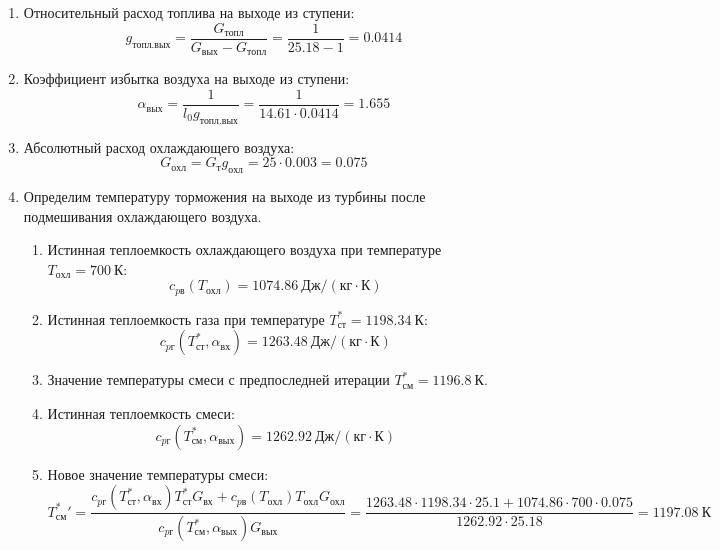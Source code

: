 \documentclass[a4paper,10pt]{article}
\begin{document}
\begin{enumerate}
        \item Относительный расход топлива на выходе из ступени:
        \[
            g_{топл.вых} = \frac{ G_{топл} }{ G_{вых} - G_{топл} } =
                 \frac{ 1 }{ 25.18 - 1 } =
            0.0414
        \]

        \item Коэффициент избытка воздуха на выходе из ступени:
        \[
            \alpha_{вых} = \frac{ 1 }{ l_0 g_{топл.вых} } =
                \frac{ 1 }{ 14.61 \cdot 0.0414 } =
            1.655
        \]

        \item Абсолютный расход охлаждающего воздуха:
        \[
            G_{охл} = G_т g_{охл} = 25 \cdot 0.003 =
            0.075
        \]

        \item Определим температуру торможения на выходе из турбины после подмешивания охлаждающего воздуха.
        \begin{enumerate}

            \item Истинная теплоемкость охлаждающего воздуха при температуре $T_{охл} = 700\ К $:
            \[
                c_{pв} (T_{охл}) = 1074.86\ Дж/ (кг \cdot К)
            \]

            \item Истинная теплоемкость газа при температуре $T_{ст}^* = 1198.34 \ К $:
            \[
                c_{pг} (T_{ст}^*, \alpha_{вх}) =
                1263.48\ Дж/ (кг \cdot К)
            \]

            \item Значение температуры смеси с предпоследней итерации $T_{см}^{*} = 1196.8\ К$.

            \item Истинная теплоемкость смеси:
            \[
                c_{pг} (T_{см}^{*}, \alpha_{вых}) =
                1262.92\ Дж/ (кг \cdot К)
            \]

            \item Новое значение температуры смеси:
            \[
                T_{см}^*\prime = \frac{
                        c_{pг} (T_{ст}^*, \alpha_{вх}) T_{ст}^* G_{вх} + c_{pв} (T_{охл}) T_{охл} G_{охл}
                    }{
                        c_{pг} (T_{см}^{*}, \alpha_{вых}) G_{вых}
                    } =
                \frac{
                    1263.48
                    \cdot 1198.34 \cdot 25.1 +
                    1074.86
                    \cdot 700 \cdot 0.075
                }{
                    1262.92
                    \cdot  25.18
                } =
                1197.08\ К
            \]


\end{enumerate}
\end{enumerate}
\end{document}

